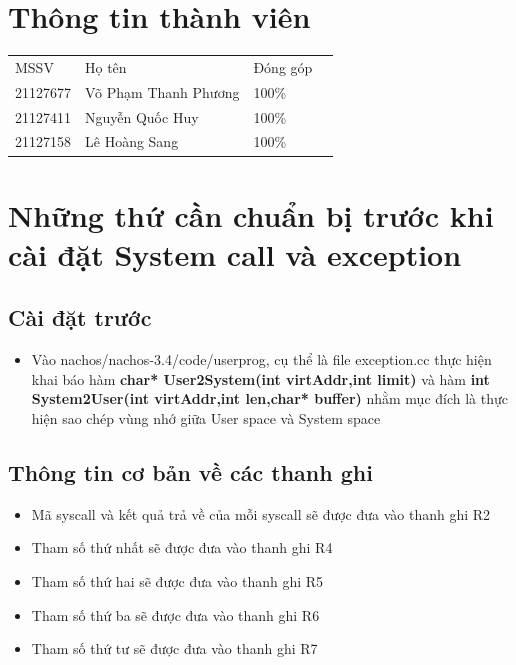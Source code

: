 \documentclass[12pt,a4paper]{article}
\begin{document}
\newpage
\renewcommand*\contentsname{\centering Table of content}
\tableofcontents
\newpage
\section{Thông tin thành viên}
\begin{table}[htp]
\centering
\begin{tabular}{|l|l|l|l}
\cline{1-3}
MSSV     & Họ tên               & Đóng góp &  \\ \cline{1-3}
21127677 & Võ Phạm Thanh Phương & 100\%    &  \\ \cline{1-3}
21127411 & Nguyễn Quốc Huy      & 100\%    &  \\ \cline{1-3}
21127158 & Lê Hoàng Sang        & 100\%    &  \\ \cline{1-3}
\end{tabular}
\end{table}
\section{Những thứ cần chuẩn bị trước khi cài đặt System call và exception}
\subsection{Cài đặt trước}
\begin{itemize}
    \item Vào nachos/nachos-3.4/code/userprog, cụ thể là file exception.cc thực hiện khai báo hàm \textbf{char* User2System(int virtAddr,int limit) } và hàm \textbf{int System2User(int virtAddr,int len,char* buffer) } nhằm mục đích là thực hiện sao chép vùng nhớ giữa User space và System space
\end{itemize}
\subsection{Thông tin cơ bản về các thanh ghi}
\begin{itemize}
    \item Mã syscall và kết quả trả về của mỗi syscall sẽ được đưa vào thanh ghi R2
    \item Tham số thứ nhất sẽ được đưa vào thanh ghi R4
    \item Tham số thứ hai sẽ được đưa vào thanh ghi R5
    \item Tham số thứ ba sẽ được đưa vào thanh ghi R6
    \item Tham số thứ tư sẽ được đưa vào thanh ghi R7 
\end{itemize}
\end{document}
